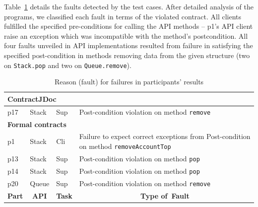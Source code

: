 Table~\ref{tab:faults} details the faults detected by the test cases. After detailed analysis of the programs, we classified each fault in terms of the violated contract. 
All clients fulfilled the specified pre-conditions for calling the API methods -- p1's API client raise an exception which was incompatible with the method's postcondition.
All four faults unveiled in API implementations resulted from failure in satisfying the specified post-condition in methods removing data from the given structure (two on \texttt{Stack.pop} and two on \texttt{Queue.remove}).

\begin{table}
\centering
\caption{Reason (fault) for failures in participants' results}
\label{tab:faults}
\begin{adjustbox}{width=\textwidth}
\begin{tabular}{|l|l|l|l|} 
\hline
\multicolumn{4}{|l|}{\textbf{ContractJDoc }}                                                                                                                                                                    \\ 
\hline
p17                                        & Stack                             & Sup                                & Post-condition violation on method \texttt{remove}                                    \\ 
\hline
\multicolumn{4}{|l|}{\textbf{Formal contracts} }                                                                                                                                                                \\ 
\hline
p1                                         & Stack                             & Cli                                & Failure to expect correct exceptions from Post-condition on method \texttt{removeAccountTop}    \\ 
\hline
p13                                        & Stack                             & Sup                                & Post-condition violation on method \texttt{pop}     \\ 
\hline
p14                                        & Stack                             & Sup                                & Post-condition violation on method \texttt{pop}     \\ 
\hline
p20                                        & Queue                             & Sup                                & Post-condition violation on method \texttt{remove}  \\ 
\hline\hline
\multicolumn{1}{|c|}{\textbf{Part}} & \multicolumn{1}{c|}{\textbf{API}} & \multicolumn{1}{c|}{\textbf{Task}} & \multicolumn{1}{c|}{\textbf{Type of~Fault}}                                               \\
\hline
\end{tabular}
\end{adjustbox}
\end{table}

